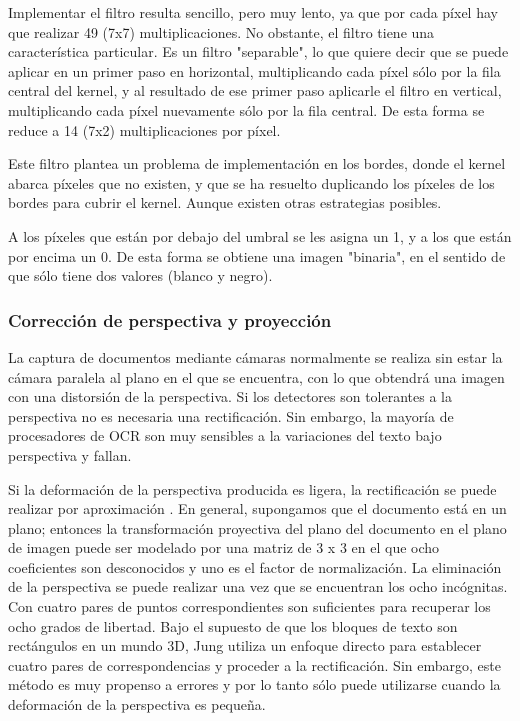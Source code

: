 Implementar el filtro resulta sencillo, pero muy lento, ya que por cada píxel hay que realizar 49 (7x7) multiplicaciones. No obstante, el filtro tiene una característica particular. Es un filtro "separable", lo que quiere decir que se puede aplicar en un primer paso en horizontal, multiplicando cada píxel sólo por la fila central del kernel, y al resultado de ese primer paso aplicarle el filtro en vertical, multiplicando cada píxel nuevamente sólo por la fila central. De esta forma se reduce a 14 (7x2) multiplicaciones por píxel. 

Este filtro plantea un problema de implementación en los bordes, donde el kernel abarca píxeles que no existen, y que se ha resuelto duplicando los píxeles de los bordes para cubrir el kernel. Aunque existen otras estrategias posibles.

A los píxeles que están por debajo del umbral se les asigna un 1, y a los que están por encima un 0. De esta forma se obtiene una imagen "binaria", en el sentido de que sólo tiene dos valores (blanco y negro).

\subsubsection{Corrección de perspectiva y proyección}
La captura de documentos mediante cámaras normalmente se realiza sin estar la cámara paralela al plano en el que se encuentra, con lo que obtendrá una imagen con una distorsión de la perspectiva. 
Si los detectores son tolerantes a la perspectiva no es necesaria una rectificación. Sin embargo, la mayoría de procesadores de OCR son muy sensibles a la variaciones del texto bajo perspectiva y fallan.

Si la deformación de la perspectiva producida es ligera, la rectificación se puede realizar por aproximación \cite{Hsieh}. En general, supongamos que el documento está en un plano; entonces la transformación proyectiva del plano del documento en el plano de imagen puede ser modelado por una matriz de 3 x 3 en el que ocho coeficientes son desconocidos y uno es el factor de normalización. La eliminación de la perspectiva se puede realizar una vez que se encuentran los ocho incógnitas. Con cuatro pares de puntos correspondientes son suficientes para recuperar los ocho grados de libertad. Bajo el supuesto de que los bloques de texto son rectángulos en un mundo 3D, Jung \cite{Jung}  utiliza un enfoque directo para establecer cuatro pares de correspondencias y proceder a la rectificación. Sin embargo, este método es muy propenso a errores y por lo tanto sólo puede utilizarse cuando la deformación de la perspectiva es pequeña.

